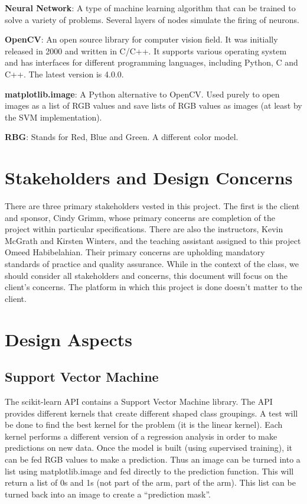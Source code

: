 \documentclass[10pt,journal,compsoc, draftclsnofoot,onecolumn]{IEEEtran}
\begin{document}
\textbf{Neural Network}: A type of machine learning algorithm that can be trained to solve a variety of problems. Several layers of nodes simulate the firing of neurons.

\textbf{OpenCV}: An open source library for computer vision field.
It was initially released in 2000 and written in C/C++.
It supports various operating system and has interfaces for different programming languages, including Python, C and C++. The latest version is 4.0.0.

\textbf{matplotlib.image}: A Python alternative to OpenCV.
Used purely to open images as a list of RGB values and save lists of RGB values as images (at least by the SVM implementation).

\textbf{RBG}: Stands for Red, Blue and Green. A different color model.

\section{Stakeholders and Design Concerns}
There are three primary stakeholders vested in this project.
The first is the client and sponsor, Cindy Grimm, whose primary concerns are completion of the project within particular specifications.
There are also the instructors, Kevin McGrath and Kirsten Winters, and the teaching assistant assigned to this project Omeed Habibelahian.
Their primary concerns are upholding mandatory standards of practice and quality assurance.
While in the context of the class, we should consider all stakeholders and concerns, this document will focus on the client's concerns.
The platform in which this project is done doesn't matter to the client.

\section{Design Aspects}
\subsection{Support Vector Machine}
The scikit-learn API contains a Support Vector Machine library.
The API provides different kernels that create different shaped class groupings.
A test will be done to find the best kernel for the problem (it is the linear kernel).
Each kernel performs a different version of a regression analysis in order to make predictions on new data.
Once the model is built (using supervised training), it can be fed RGB values to make a prediction.
Thus an image can be turned into a list using matplotlib.image and fed directly to the prediction function.
This will return a list of 0s and 1s (not part of the arm, part of the arm).
This list can be turned back into an image to create a ``prediction mask''.
\end{document}
